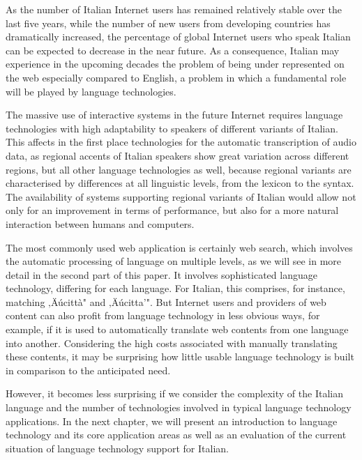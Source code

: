 \begin{multicols}{2}
As the number of Italian Internet users has remained relatively stable over
the last five years, while the number of new users from developing countries
has dramatically increased, the percentage of global Internet users who speak
Italian can be expected to decrease in the near future. As a consequence,
Italian may experience in the upcoming decades the problem of being under
represented on the web especially compared to English, a problem in
which a fundamental role will be played by language technologies.


The massive use of interactive systems in the future Internet requires
language technologies with high adaptability to speakers of different variants
of Italian. This affects in the first place technologies for the automatic
transcription of audio data, as regional accents of Italian speakers show
great variation across different regions, but all other language technologies
as well, because regional variants are characterised by differences at all
linguistic levels, from the lexicon to the syntax. The availability of systems
supporting regional variants of Italian would allow not only for an
improvement in terms of performance, but also for a more natural interaction
between humans and computers.
 
The most commonly used web application is certainly web search, which involves
the automatic processing of language on multiple levels, as we will see in
more detail in the second part of this paper. It involves sophisticated
language technology, differing for each language. For Italian, this comprises,
for instance, matching ‚Äúcitt\`{a}" and ‚Äúcitta'". But Internet
users and providers of web content can also profit from language technology in
less obvious ways, for example, if it is used to automatically translate web
contents from one language into another. Considering the high costs associated
with manually translating these contents, it may be surprising how little
usable language technology is built in comparison to the anticipated need.

However, it becomes less surprising if we consider the complexity of the
Italian language and the number of technologies involved in typical language 
technology applications. In the next chapter, we will present an introduction 
to language technology and its core application areas as well as an evaluation 
of the current situation of language technology support for Italian. 
\end{multicols}

